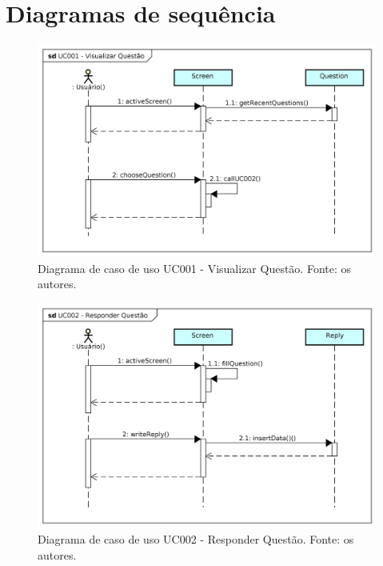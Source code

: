 \section{Diagramas de sequência}

\begin{figure}[!htb]
\centering
\includegraphics[width=16cm]{UC001-VisualizarQuestao.png}
\caption{Diagrama de caso de uso UC001 - Visualizar Questão. Fonte: os autores.}
\label{fig:UC001}
\end{figure}

\begin{figure}[!htb]
\centering
\includegraphics[width=16cm]{UC002-ResponderQuestao.png}
\caption{Diagrama de caso de uso UC002 - Responder Questão. Fonte: os autores.}
\label{fig:UC002}
\end{figure}

